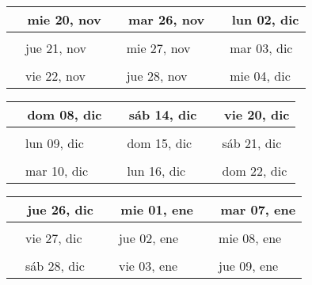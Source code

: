 \documentclass[letterpaper,10pt]{article}
\begin{document}
\begin{tabular}{lll}
\\
{\ \ mie 20, nov\hspace{4.5cm}\vspace{2.25cm}} &{\ \ mar 26, nov\hspace{4.5cm}} &{\ \ lun 02, dic\hspace{4.5cm}}
\\ \hline \\
{\ \ jue 21, nov\vspace{2.25cm}} & {\ \ mie 27, nov} & {\ \ mar 03, dic}
\\ \hline \\
{\ \ vie 22, nov\vspace{2.25cm}} & {\ \ jue 28, nov} & {\ \ mie 04, dic}
\\
\end{tabular}\par
\begin{tabular}{lll}
\\
{\ \ dom 08, dic\hspace{4.5cm}\vspace{2.25cm}} &{\ \ sáb 14, dic\hspace{4.5cm}} &{\ \ vie 20, dic\hspace{4.5cm}}
\\ \hline \\
{\ \ lun 09, dic\vspace{2.25cm}} & {\ \ dom 15, dic} & {\ \ sáb 21, dic}
\\ \hline \\
{\ \ mar 10, dic\vspace{2.25cm}} & {\ \ lun 16, dic} & {\ \ dom 22, dic}
\\
\end{tabular}\par
\begin{tabular}{lll}
\\
{\ \ jue 26, dic\hspace{4.5cm}\vspace{2.25cm}} &{\ \ mie 01, ene\hspace{4.5cm}} &{\ \ mar 07, ene\hspace{4.5cm}}
\\ \hline \\
{\ \ vie 27, dic\vspace{2.25cm}} & {\ \ jue 02, ene} & {\ \ mie 08, ene}
\\ \hline \\
{\ \ sáb 28, dic\vspace{2.25cm}} & {\ \ vie 03, ene} & {\ \ jue 09, ene}
\\
\end{tabular}\par
\end{document}
